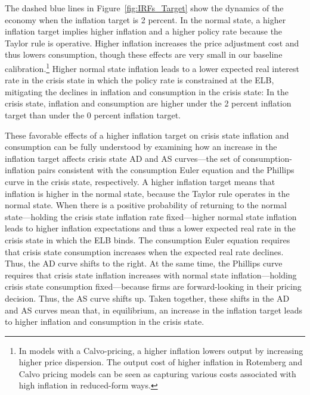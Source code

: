 \documentclass[11pt]{article}
\begin{document}
	The dashed blue lines in Figure~\ref{fig:IRFs_Target} show the dynamics of the economy when the inflation target is 2 percent. In the normal state, a higher inflation target implies higher inflation and a higher policy rate because the Taylor rule is operative. Higher inflation increases the price adjustment cost and thus lowers consumption, though these effects are very small in our baseline calibration.\footnote{In models with a Calvo-pricing, a higher inflation lowers output by increasing higher price dispersion. The output cost of higher inflation in Rotemberg and Calvo pricing models can be seen as capturing various costs associated with high inflation in reduced-form ways.} Higher normal state inflation leads to a lower expected real interest rate in the crisis state in which the policy rate is constrained at the ELB, mitigating the declines in inflation and consumption in the crisis state: In the crisis state, inflation and consumption are higher under the 2 percent inflation target than under the 0 percent inflation target. 
	
	These favorable effects of a higher inflation target on crisis state inflation and consumption can be fully understood by examining how an increase in the inflation target affects crisis state AD and AS curves---the set of consumption-inflation pairs consistent with the consumption Euler equation and the Phillips curve in the crisis state, respectively. A higher inflation target means that inflation is higher in the normal state, because the Taylor rule operates in the normal state. When there is a positive probability of returning to the normal state---holding the crisis state inflation rate fixed---higher normal state inflation leads to higher inflation expectations and thus a lower expected real rate in the crisis state in which the ELB binds. The consumption Euler equation requires that crisis state consumption increases when the expected real rate declines. Thus, the AD curve shifts to the right. At the same time, the Phillips curve requires that crisis state inflation increases with normal state inflation---holding crisis state consumption fixed---because firms are forward-looking in their pricing decision. Thus, the AS curve shifts up. Taken together, these shifts in the AD and AS curves mean that, in equilibrium, an increase in the inflation target leads to higher inflation and consumption in the crisis state.
	
\end{document}

